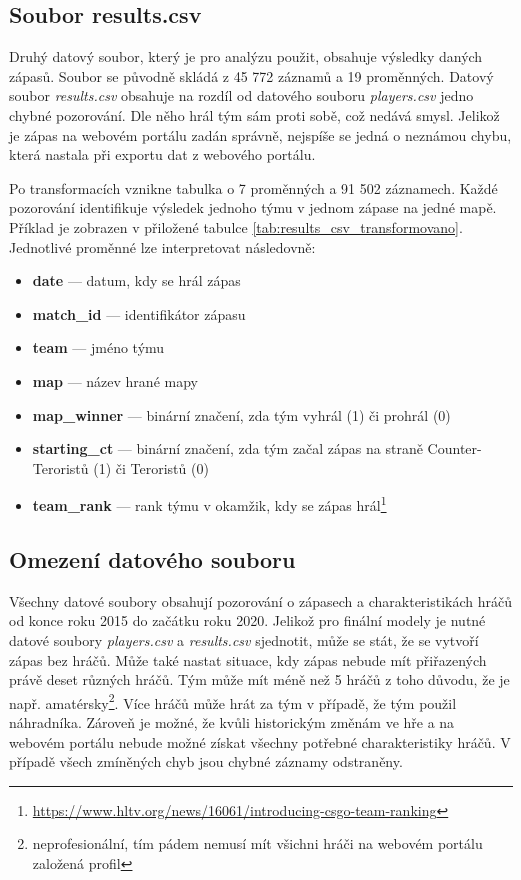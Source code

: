 \subsection{Soubor results.csv}
Druhý datový soubor, který je pro analýzu použit, obsahuje výsledky daných zápasů. Soubor se původně skládá z 45 772 záznamů a 19 proměnných. Datový soubor 
\textit{results.csv} obsahuje na rozdíl od datového souboru \textit{players.csv} jedno chybné pozorování. Dle něho hrál tým sám proti sobě, což nedává smysl.
Jelikož je zápas na webovém portálu zadán správně, nejspíše se jedná o neznámou chybu, která nastala při exportu dat z webového portálu.

Po transformacích vznikne tabulka o 7 proměnných a 91 502 záznamech. Každé pozorování identifikuje výsledek jednoho týmu v jednom zápase
na jedné mapě. Příklad je zobrazen v přiložené tabulce \ref{tab:results_csv_transformovano}. Jednotlivé proměnné lze interpretovat následovně:
\begin{itemize}
    \item \textbf{date} --- datum, kdy se hrál zápas
    \item \textbf{match\_id} --- identifikátor zápasu
    \item \textbf{team} --- jméno týmu
    \item \textbf{map} --- název hrané mapy
    \item \textbf{map\_winner} --- binární značení, zda tým vyhrál (1) či prohrál (0)
    \item \textbf{starting\_ct} --- binární značení, zda tým začal zápas na straně Counter-Teroristů (1) či Teroristů (0)
    \item \textbf{team\_rank} --- rank týmu v okamžik, kdy se zápas hrál\footnote{\url{https://www.hltv.org/news/16061/introducing-csgo-team-ranking}}
\end{itemize}

\subsection{Omezení datového souboru}
{\color{red}
Všechny datové soubory obsahují pozorování o zápasech a charakteristikách hráčů od konce roku 2015 do začátku roku 2020. Jelikož pro finální modely je nutné datové soubory
\textit{players.csv} a \textit{results.csv} sjednotit, může se stát, že se vytvoří zápas bez hráčů. Může také nastat situace, kdy zápas nebude mít přiřazených právě 
deset různých hráčů. Tým může mít méně než 5 hráčů z toho důvodu, že je např.
amatérsky\footnote{neprofesionální, tím pádem nemusí mít všichni hráči na webovém portálu založená profil}. Více hráčů může hrát za tým v případě, že tým použil náhradníka.
Zároveň je možné, že kvůli historickým změnám ve hře a na webovém portálu nebude možné získat všechny potřebné charakteristiky hráčů. V případě všech zmíněných chyb jsou
chybné záznamy odstraněny.
}

